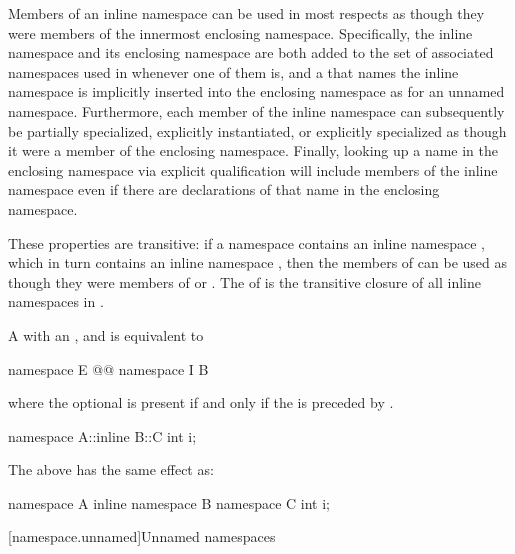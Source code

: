 \pnum
Members of an inline namespace can be used in most respects as though they were members
of the innermost enclosing namespace. Specifically, the inline namespace and its enclosing
namespace are both added to the set of associated namespaces used in
 whenever one of them is,
and a  that names the inline
namespace is implicitly inserted into the enclosing namespace as for an unnamed
namespace. Furthermore, each
member of the inline namespace can subsequently be partially
specialized, explicitly
instantiated, or explicitly specialized as
though it were a member of the enclosing namespace. Finally, looking up a name in the
enclosing namespace via explicit qualification will include
members of the inline namespace even if
there are declarations of that name in the enclosing namespace.

\pnum
These properties are transitive: if a namespace  contains an inline namespace
, which in turn contains an inline namespace , then the members of
 can be used as though they were members of  or .
The  of  is the transitive closure of all
inline namespaces in .

\pnum
A  with an
 ,
  and
 
is equivalent to
\begin{codeblock}
namespace E { @@ namespace I { B } }
\end{codeblock}
where the optional  is present if and only if
the   is preceded by .
\begin{example}
\begin{codeblock}
namespace A::inline B::C {
  int i;
}
\end{codeblock}
The above has the same effect as:
\begin{codeblock}
namespace A {
  inline namespace B {
    namespace C {
      int i;
    }
  }
}
\end{codeblock}
\end{example}

[namespace.unnamed]{Unnamed namespaces}%

